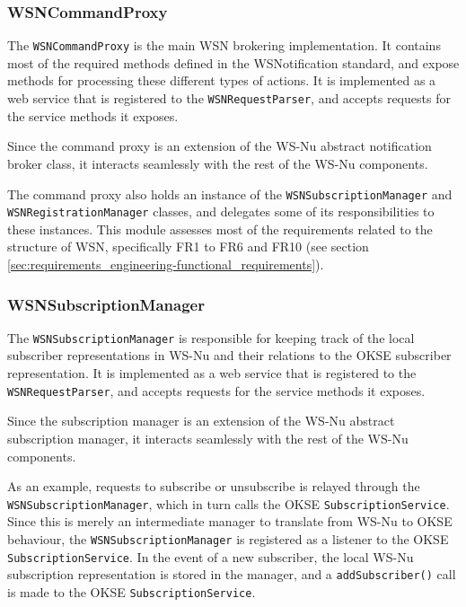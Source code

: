 \subsubsection{WSNCommandProxy}

The \verb!WSNCommandProxy! is the main WSN brokering implementation. It contains most of the required methods defined in the WSNotification standard, and expose methods for processing these different types of actions. It is implemented as a web service that is registered to the \verb!WSNRequestParser!, and accepts requests for the service methods it exposes.

Since the command proxy is an extension of the WS-Nu abstract notification broker class, it interacts seamlessly with the rest of the WS-Nu components.

The command proxy also holds an instance of the \verb!WSNSubscriptionManager! and \verb!WSNRegistrationManager! classes, and delegates some of its responsibilities to these instances. This module assesses most of the requirements related to the structure of WSN, specifically FR1 to FR6 and FR10 (see section \ref{sec:requirements_engineering-functional_requirements}).

\subsubsection{WSNSubscriptionManager}

The \verb!WSNSubscriptionManager! is responsible for keeping track of the local subscriber representations in WS-Nu and their relations to the OKSE subscriber representation. It is implemented as a web service that is registered to the \verb!WSNRequestParser!, and accepts requests for the service methods it exposes.

Since the subscription manager is an extension of the WS-Nu abstract subscription manager, it interacts seamlessly with the rest of the WS-Nu components.

As an example, requests to subscribe or unsubscribe is relayed through the \\\verb!WSNSubscriptionManager!, which in turn calls the OKSE \verb!SubscriptionService!. Since this is merely an intermediate manager to translate from WS-Nu to OKSE behaviour, the \verb!WSNSubscriptionManager! is registered as a listener to the OKSE \\ \verb!SubscriptionService!. In the event of a new subscriber, the local WS-Nu subscription representation is stored in the manager, and a \verb!addSubscriber()! call is made to the OKSE \verb!SubscriptionService!.

